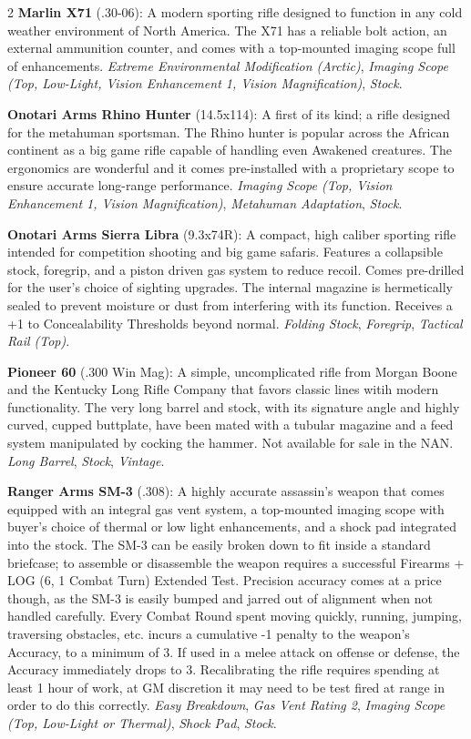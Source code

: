 \documentclass[
  oneside]{article}
\begin{document}
\begin{multicols}{2}
\textbf{Marlin X71} (.30-06): A modern sporting
rifle designed to function in any cold weather
environment of North America. The X71 has a
reliable bolt action, an external ammunition
counter, and comes with a top-mounted imaging
scope full of enhancements. \emph{Extreme
Environmental Modification (Arctic)},
\emph{Imaging Scope (Top, Low-Light, Vision
Enhancement 1, Vision Magnification)},
\emph{Stock}.

\textbf{Onotari Arms Rhino Hunter} (14.5x114): A
first of its kind; a rifle designed for the
metahuman sportsman. The Rhino hunter is popular
across the African continent as a big game rifle
capable of handling even Awakened creatures. The
ergonomics are wonderful and it comes
pre-installed with a proprietary scope to ensure
accurate long-range performance. \emph{Imaging
Scope (Top, Vision Enhancement 1, Vision
Magnification)}, \emph{Metahuman Adaptation},
\emph{Stock}.

\textbf{Onotari Arms Sierra Libra} (9.3x74R): A
compact, high caliber sporting rifle intended for
competition shooting and big game safaris.
Features a collapsible stock, foregrip, and a
piston driven gas system to reduce recoil. Comes
pre-drilled for the user's choice of sighting
upgrades. The internal magazine is hermetically
sealed to prevent moisture or dust from
interfering with its function. Receives a +1 to
Concealability Thresholds beyond normal.
\emph{Folding Stock}, \emph{Foregrip},
\emph{Tactical Rail (Top)}.

\textbf{Pioneer 60} (.300 Win Mag): A simple,
uncomplicated rifle from Morgan Boone and the
Kentucky Long Rifle Company that favors classic
lines witih modern functionality. The very long
barrel and stock, with its signature angle and
highly curved, cupped buttplate, have been mated
with a tubular magazine and a feed system
manipulated by cocking the hammer. Not available
for sale in the NAN. \emph{Long Barrel},
\emph{Stock}, \emph{Vintage}.

\textbf{Ranger Arms SM-3} (.308): A highly
accurate assassin's weapon that comes equipped
with an integral gas vent system, a top-mounted
imaging scope with buyer's choice of thermal or
low light enhancements, and a shock pad integrated
into the stock. The SM-3 can be easily broken down
to fit inside a standard briefcase; to assemble or
disassemble the weapon requires a successful
Firearms + LOG (6, 1 Combat Turn) Extended Test.
Precision accuracy comes at a price though, as the
SM-3 is easily bumped and jarred out of alignment
when not handled carefully. Every Combat Round
spent moving quickly, running, jumping, traversing
obstacles, etc. incurs a cumulative -1 penalty to
the weapon's Accuracy, to a minimum of 3. If used
in a melee attack on offense or defense, the
Accuracy immediately drops to 3. Recalibrating the
rifle requires spending at least 1 hour of work,
at GM discretion it may need to be test fired at
range in order to do this correctly. \emph{Easy
Breakdown}, \emph{Gas Vent Rating 2},
\emph{Imaging Scope (Top, Low-Light or Thermal)},
\emph{Shock Pad}, \emph{Stock}.


\end{multicols}
\end{document}
